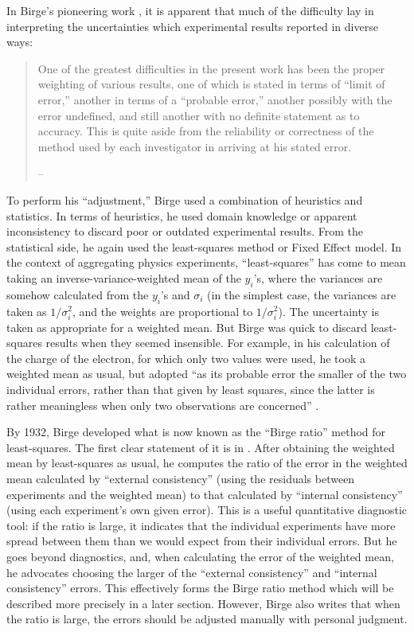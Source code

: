 \documentclass[12pt]{article}
\begin{document}
In Birge's pioneering work \citeyearpar{birge1929probable}, it is apparent that much of the difficulty lay in interpreting the uncertainties which experimental results reported in diverse ways:
\begin{quote}
  One of the greatest difficulties in the present work has been the proper weighting of various results, one of which is stated in terms of ``limit of error,'' another in terms of a ``probable error,'' another possibly with the error undefined, and still another with no definite statement as to accuracy. This is quite aside from the reliability or correctness of the method used by each investigator in arriving at his stated error.

  \hfill -- \cite{birge1929probable}
\end{quote} 

To perform his ``adjustment,'' Birge used a combination of heuristics and statistics. In terms of heuristics, he used domain knowledge or apparent inconsistency to discard poor or outdated experimental results. From the statistical side, he again used the least-squares method or Fixed Effect model. In the context of aggregating physics experiments, ``least-squares'' has come to mean taking an inverse-variance-weighted mean of the $y_i$'s, where the variances are somehow calculated from the $y_i$'s and $\sigma_i$ (in the simplest case, the variances are taken as $1/\sigma_i^2$, and the weights are proportional to $1/\sigma_i^2$). The uncertainty is taken as appropriate for a weighted mean. But Birge was quick to discard least-squares results when they seemed insensible. For example, in his calculation of the charge of the electron, for which only two values were used, he took a weighted mean as usual, but adopted ``as its probable error the smaller of the two individual errors, rather than that given by least squares, since the latter is rather meaningless when only two observations are concerned'' \citep{birge1929probable}.

By 1932, Birge developed what is now known as the ``Birge ratio'' method for least-squares. The first clear statement of it is in \cite{birge1932calculation}. After obtaining the weighted mean by least-squares as usual, he computes the ratio of the error in the weighted mean calculated by ``external consistency'' (using the residuals between experiments and the weighted mean) to that calculated by ``internal consistency'' (using each experiment's own given error). This is a useful quantitative diagnostic tool: if the ratio is large, it indicates that the individual experiments have more spread between them than we would expect from their individual errors. But he goes beyond diagnostics, and, when calculating the error of the weighted mean, he advocates choosing the larger of the ``external consistency'' and ``internal consistency'' errors. This effectively forms the Birge ratio method which will be described more precisely in a later section. However, Birge also writes that when the ratio is large, the errors should be adjusted manually with personal judgment.
\end{document}
